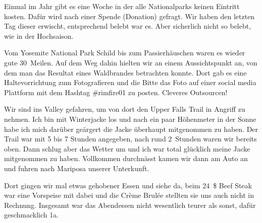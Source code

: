 Einmal im Jahr gibt es eine Woche in der alle Nationalparks keinen Eintritt kosten.
Dafür wird nach einer Spende (Donation) gefragt.
Wir haben den letzten Tag dieser erwischt, entsprechend belebt war es.
Aber sicherlich nicht so belebt, wie in der Hochsaison.

Vom Yosemite National Park Schild bis zum Passierhäuschen waren es wieder gute 30~Meilen.
Auf dem Weg dahin hielten wir an einem Aussichtspunkt an, von dem man das Resultat eines Waldbrandes betrachten konnte.
Dort gab es eine Haltevorrichtung zum Fotografieren und die Bitte das Foto auf einer social media Plattform mit dem Hashtag #rimfire01 zu posten.
Cleveres Outsourcen!

Wir sind ins Valley gefahren, um von dort den Upper Falls Trail in Angriff zu nehmen.
Ich bin mit Winterjacke los und nach ein paar Höhenmeter in der Sonne habe ich mich darüber geärgert die Jacke überhaupt mitgenommen zu haben.
Der Trail war mit 5 bis 7 Stunden angegeben, nach rund 2~Stunden waren wir bereits oben.
Dann schlug aber das Wetter um und ich war total glücklich meine Jacke mitgenommen zu haben.
Vollkommen durchnässt kamen wir dann am Auto an und fuhren nach Mariposa unserer Unterkunft.

Dort gingen wir mal etwas gehobener Essen und siehe da, beim 24~\$ Beef Steak war eine Vorspeise mit dabei und die Crème Brulée stellten sie uns auch nicht in Rechnung.
Insgesamt war das Abendessen nicht wesentlich teurer als sonst, dafür geschmacklich 1a.
